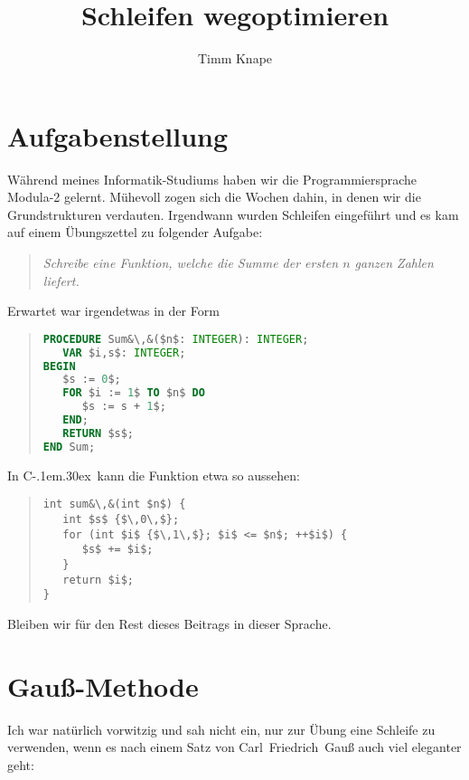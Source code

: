 \documentclass[a5paper,landscape,ngerman,10pt]{article}
\title{Schleifen wegoptimieren}
\author{Timm Knape}
\begin{document}
\newcommand{\cpp}{C\kern-.1em\raise.30ex\hbox{\smaller{++}}}
\lstset{
  columns=fullflexible,
  language=[11]C++,
  mathescape=true,
  escapechar=\&
}
%
\maketitle
%
\section{Aufgabenstellung}
%
Während meines Informatik-Studiums haben wir die
Programmiersprache \hbox{\sc Modula-2} gelernt.
Mühevoll zogen sich die Wochen dahin, in denen wir die
Grundstrukturen verdauten.
Irgendwann wurden Schleifen eingeführt und es kam auf
einem Übungszettel zu folgender Aufgabe:

\begin{quotation}
\it Schreibe eine Funktion, welche die 
Summe der ersten $n$ ganzen Zahlen liefert.
\end{quotation}

Erwartet war irgendetwas in der Form

\begin{quotation}
\begin{lstlisting}[language=Modula-2, morekeywords={TO}]
PROCEDURE Sum&\,&($n$: INTEGER): INTEGER;
   VAR $i,s$: INTEGER;
BEGIN
   $s := 0$;
   FOR $i := 1$ TO $n$ DO
      $s := s + 1$;
   END;
   RETURN $s$;
END Sum;
\end{lstlisting}
\end{quotation}

In \cpp\ kann die Funktion etwa so aussehen:

\begin{quotation}
\begin{lstlisting}
int sum&\,&(int $n$) {
   int $s$ {$\,0\,$};
   for (int $i$ {$\,1\,$}; $i$ <= $n$; ++$i$) {
      $s$ += $i$;
   }
   return $i$;
}
\end{lstlisting}
\end{quotation}

Bleiben wir für den Rest dieses Beitrags in dieser Sprache.

\section{Gauß-Methode}

Ich war natürlich vorwitzig und sah nicht ein,
nur zur Übung eine Schleife zu verwenden,
wenn es nach einem Satz von 
Carl~Friedrich~Gauß auch viel eleganter geht:
\end{document}

